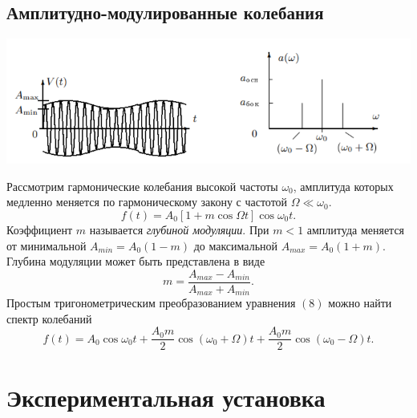 \documentclass[12pt,a4paper]{article}
\begin{document}
\subsection{Амплитудно-модулированные колебания}
\begin{center}
\includegraphics[scale=0.9]{s3.png}
\end{center}
Рассмотрим гармонические колебания высокой частоты $\omega_0$, амплитуда которых медленно меняется по гармоническому закону с частотой $\Omega \ll \omega_0$.
\begin{equation}
f(t) = A_0 \left[1+m\cos \Omega t\right] \cos \omega_0 t.
\end{equation}
Коэффициент $m$ называется \textit{глубиной модуляции}. При $m < 1$ амплитуда меняется от минимальной $A_{min} = A_0(1-m)$ до максимальной $A_{max} = A_0(1+m)$. Глубина модуляции может быть представлена в виде
\begin{equation}
m = \dfrac{A_{max}-A_{min}}{A_{max}+A_{min}}.
\end{equation}
Простым тригонометрическим преобразованием уравнения $(8)$ можно найти спектр колебаний
\begin{equation}
f(t) = A_0 \cos \omega_0t + \dfrac{A_0m}{2} \cos \left(\omega_0 + \Omega\right)t + \dfrac{A_0m}{2}\cos\left(\omega_0 - \Omega\right)t.
\end{equation}

\section{Экспериментальная установка}
\end{document}
